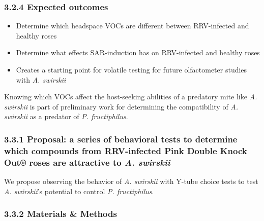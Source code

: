 \documentclass[12pt,final,CPage]{ufthesis}
\begin{document}
{  \hypertarget{expected-outcomes-1}{%
  \subsubsection{3.2.4 Expected outcomes}\label{expected-outcomes-1}}
  \begin{itemize}
  \item
    Determine which headspace VOCs are different between RRV-infected and healthy roses
  \item
    Determine what effects SAR-induction has on RRV-infected and healthy roses
  \item
    Creates a starting point for volatile testing for future olfactometer studies with \emph{A. swirskii}
  \end{itemize}
  Knowing which VOCs affect the host-seeking abilities of a predatory mite like \emph{A. swirskii} is part of preliminary work for determining the compatibility of \emph{A. swirskii} as a predator of \emph{P. fructiphilus}.

  \hypertarget{proposal-a-series-of-behavioral-tests-to-determine-which-compounds-from-rrv-infected-pink-double-knock-out-roses-are-attractive-to-a.-swirskii}{%
  \subsubsection{\texorpdfstring{3.3.1 Proposal: a series of behavioral tests to determine which compounds from RRV-infected Pink Double Knock Out® roses are attractive to \emph{A. swirskii}}{3.3.1 Proposal: a series of behavioral tests to determine which compounds from RRV-infected Pink Double Knock Out® roses are attractive to A. swirskii}}\label{proposal-a-series-of-behavioral-tests-to-determine-which-compounds-from-rrv-infected-pink-double-knock-out-roses-are-attractive-to-a.-swirskii}}

  We propose observing the behavior of \emph{A. swirskii} with Y-tube choice tests to test \emph{A. swirskii}'s potential to control \emph{P. fructiphilus}.

  \hypertarget{materials-methods-2}{%
  \subsubsection{3.3.2 Materials \& Methods}\label{materials-methods-2}}

}
\end{document}
